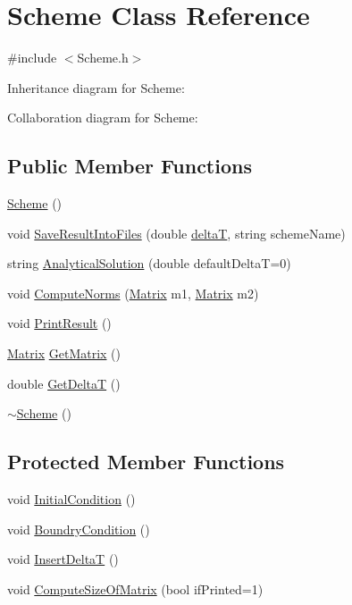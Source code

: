 \hypertarget{class_scheme}{}\section{Scheme Class Reference}
\label{class_scheme}


{\ttfamily \#include $<$Scheme.\+h$>$}



Inheritance diagram for Scheme\+:


Collaboration diagram for Scheme\+:
\subsection*{Public Member Functions}
\begin{DoxyCompactItemize}
\item 
\mbox{\hyperlink{class_scheme_aa0b319a6594176dea40ca78562401b53}{Scheme}} ()
\item 
void \mbox{\hyperlink{class_scheme_ae4512b4c8ead4d8ced95174f0b241f8a}{Save\+Result\+Into\+Files}} (double \mbox{\hyperlink{class_scheme_aaaf978f98d30bd96ea56a9387d1b2c5a}{deltaT}}, string scheme\+Name)
\item 
string \mbox{\hyperlink{class_scheme_a7d3e9f8133a955517471eb7a6fea355f}{Analytical\+Solution}} (double default\+DeltaT=0)
\item 
void \mbox{\hyperlink{class_scheme_ae098876d0287ac2bf5220608db2a8468}{Compute\+Norms}} (\mbox{\hyperlink{class_matrix}{Matrix}} m1, \mbox{\hyperlink{class_matrix}{Matrix}} m2)
\item 
void \mbox{\hyperlink{class_scheme_ae26048cf5128c6ea6e698a7036f2cc42}{Print\+Result}} ()
\item 
\mbox{\hyperlink{class_matrix}{Matrix}} \mbox{\hyperlink{class_scheme_a14c333d182a6b4e94aa2a346000257ea}{Get\+Matrix}} ()
\item 
double \mbox{\hyperlink{class_scheme_af05aa7671d5c080c0cca501cb6717cd0}{Get\+DeltaT}} ()
\item 
\mbox{\hyperlink{class_scheme_af8f283786d3b27d97c55d92b9ae8b20b}{$\sim$\+Scheme}} ()
\end{DoxyCompactItemize}
\subsection*{Protected Member Functions}
\begin{DoxyCompactItemize}
\item 
void \mbox{\hyperlink{class_scheme_ad3546cda995629a2792629a072760ad2}{Initial\+Condition}} ()
\item 
void \mbox{\hyperlink{class_scheme_a36885039937c25f13c8daea654e37b97}{Boundry\+Condition}} ()
\item 
void \mbox{\hyperlink{class_scheme_ac5803e4951dc125b274f543d5037c21d}{Insert\+DeltaT}} ()
\item 
void \mbox{\hyperlink{class_scheme_a0364e328d78e84be15d293a66d946008}{Compute\+Size\+Of\+Matrix}} (bool if\+Printed=1)
\end{DoxyCompactItemize}
